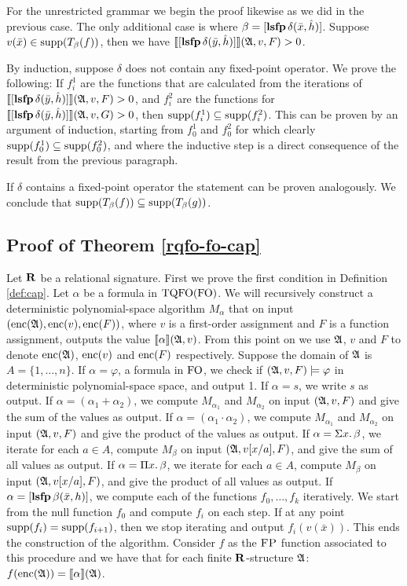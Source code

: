 \vspace{1em}
For the unrestricted grammar we begin the proof likewise as we did in the previous case. The only additional case is  where $\beta = [{\bf lsfp} \, \delta(\bar{x},\hat{h})]$. Suppose $v(\bar{x})\in\text{\rm supp}(T_{\beta}(f))$, then we have ${\llbracket{}{[{\bf lsfp} \, \delta(\bar{y},\hat{h})]}\rrbracket}(\mathfrak{A},v,F) > 0$. 

By induction, suppose $\delta$ does not contain any fixed-point operator. We prove the following: If $f^1_i$ are the functions that are calculated from the iterations of ${\llbracket{}{[{\bf lsfp} \, \delta(\bar{y},\hat{h})]}\rrbracket}(\mathfrak{A},v,F) > 0$, and $f^2_i$ are the functions for ${\llbracket{}{[{\bf lsfp} \, \delta(\bar{y},\hat{h})]}\rrbracket}(\mathfrak{A},v,G) > 0$, then $\text{\rm supp}(f^1_i)\subseteq\text{\rm supp}(f^2_i)$. This can be proven by an argument of induction, starting from $f^1_0$ and $f^2_0$ for which clearly $\text{\rm supp}(f^1_0) \subseteq \text{\rm supp}(f^2_0)$, and where the inductive step is a direct consequence of the result from the previous paragraph.

If $\delta$ contains a fixed-point operator the statement can be proven analogously. We conclude that $\text{\rm supp}(T_{\beta}(f))\subseteq\text{\rm supp}(T_{\beta}(g))$.

\subsection*{Proof of Theorem \ref{rqfo-fo-cap}}

Let $\mathbf{R}$ be a relational signature. First we prove the first condition in Definition \ref{def:cap}. Let $\alpha$ be a formula in ${\rm TQFO}({\rm FO})$.
We will recursively construct a deterministic polynomial-space algorithm $M_{\alpha}$ that on input $({\rm enc}(\mathfrak{A}),{\rm enc}(v),{\rm enc}(F))$, where $v$ is a first-order assignment and $F$ is a function assignment, outputs the value ${\llbracket{}{\alpha}\rrbracket}(\mathfrak{A},v)$.
From this point on we use $\mathfrak{A}$, $v$ and $F$ to denote ${\rm enc}(\mathfrak{A})$, ${\rm enc}(v)$ and ${\rm enc}(F)$ respectively.
Suppose the domain of $\mathfrak{A}$ is $A = \{1,\ldots,n\}$.
If $\alpha = \varphi$, a formula in ${\rm FO}$, we check if $(\mathfrak{A},v,F)\models\varphi$ in deterministic polynomial-space space, and output 1.
If $\alpha = s$, we write $s$ as output.
If $\alpha = (\alpha_1 + \alpha_2)$, we compute $M_{\alpha_1}$ and $M_{\alpha_2}$ on input $(\mathfrak{A},v,F)$ and give the sum of the values as output.
If $\alpha = (\alpha_1\cdot\alpha_2)$, we compute $M_{\alpha_1}$ and $M_{\alpha_2}$ on input $(\mathfrak{A},v,F)$ and give the product of the values as output.
If $\alpha = \Sigma{x}.\,\beta$, we iterate for each $a\in A$, compute $M_{\beta}$ on input $(\mathfrak{A},v[x/a],F)$, and give the sum of all values as output.
If $\alpha = \Pi{x}.\,\beta$, we iterate for each $a\in A$, compute $M_{\beta}$ on input $(\mathfrak{A},v[x/a],F)$, and give the product of all values as output.
If $\alpha = [{\bf lsfp} \, \beta(\bar{x},h)]$, we compute each of the functions $f_0,\ldots,f_k$ iteratively. We start from the null function $f_0$ and compute $f_i$ on each step. If at any point $\text{\rm supp}(f_i) = \text{\rm supp}(f_{i+1})$, then we stop iterating and output $f_i(v(\bar{x}))$.
This ends the construction of the algorithm.
Consider $f$ as the $\text{\sc FP}$ function associated to this procedure and we have that for each finite $\mathbf{R}$-structure $\mathfrak{A}$: $f({\rm enc}(\mathfrak{A})) = {\llbracket{}{\alpha}\rrbracket}(\mathfrak{A})$.

